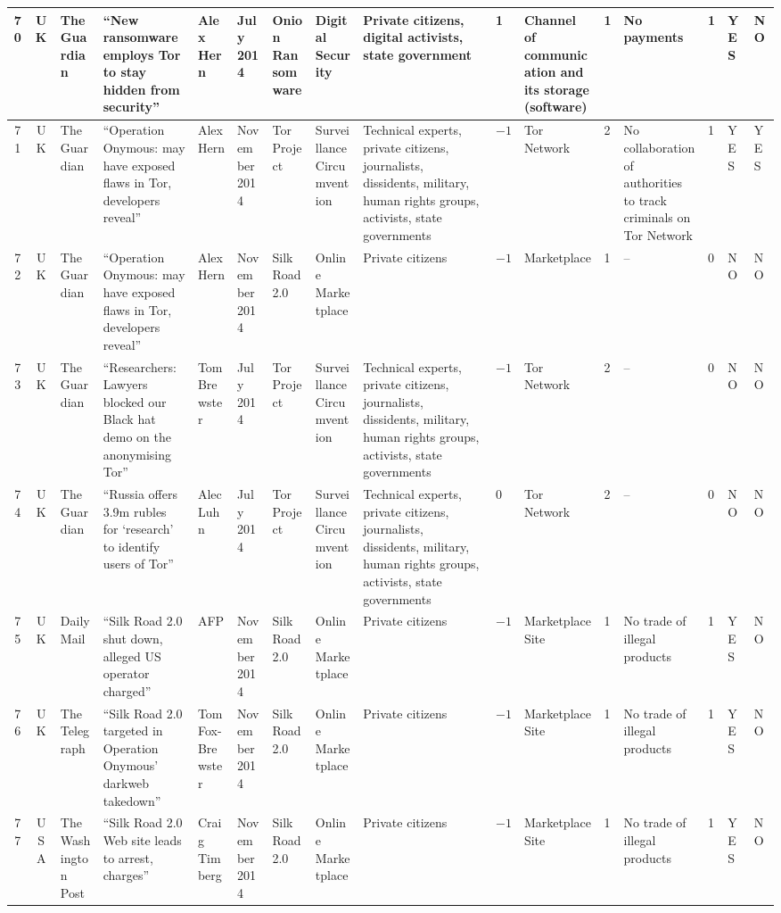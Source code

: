 \begin{landscape}
{\begin{longtable}{|c|c|p{1.2cm}|p{2.5cm}|p{1.4cm}|p{1.2cm}|p{1.4cm}|p{1.2cm}|p{1.8cm}|p{0.4cm}|p{1.8cm}|p{0.4cm}|p{1.5cm}|p{0.4cm}|p{0.6cm}|p{0.6cm}|}
\hline
70 & UK & The Guardian & ``New ransomware employs Tor to stay hidden from security'' & Alex Hern & July 2014 &Onion Ransomware & Digital Security & Private citizens, digital activists, state government & 1 & Channel of communication and its storage (software) & 1 & No payments & 1 & YES & NO \\
\hline
71 & UK & The Guardian & ``Operation Onymous: may have exposed flaws in Tor, developers reveal'' & Alex Hern & November 2014 &Tor Project & Surveillance Circumvention & Technical experts, private citizens, journalists, dissidents, military, human rights groups, activists, state governments & $-1$ & Tor Network & 2 & No collaboration of authorities to track criminals on Tor Network & 1 & YES & YES \\
\hline
72 & UK & The Guardian & ``Operation Onymous: may have exposed flaws in Tor, developers reveal'' & Alex Hern & November 2014 &Silk Road 2.0 & Online Marketplace & Private citizens & $-1$ & Marketplace & 1 & -- & 0 & NO & NO \\
\hline
73 & UK & The Guardian & ``Researchers: Lawyers blocked our Black hat demo on the anonymising Tor'' & Tom Brewster & July 2014 &Tor Project & Surveillance Circumvention & Technical experts, private citizens, journalists, dissidents, military, human rights groups, activists, state governments & $-1$ & Tor Network & 2 & -- & 0 & NO & NO \\
\hline
74 & UK & The Guardian & ``Russia offers 3.9m rubles for `research' to identify users of Tor'' & Alec Luhn & July 2014 &Tor Project & Surveillance Circumvention & Technical experts, private citizens, journalists, dissidents, military, human rights groups, activists, state governments & 0 & Tor Network & 2 & -- & 0 & NO & NO \\
\hline
75 & UK & Daily Mail & ``Silk Road 2.0 shut down, alleged US operator charged'' & AFP & November 2014 &Silk Road 2.0 & Online Marketplace & Private citizens & $-1$ & Marketplace Site & 1 & No trade of illegal products & 1 & YES & NO \\
\hline
76 & UK & The Telegraph & ``Silk Road 2.0 targeted in Operation Onymous' darkweb takedown'' & Tom Fox-Brewster & November 2014 &Silk Road 2.0 & Online Marketplace & Private citizens & $-1$ & Marketplace Site & 1 & No trade of illegal products & 1 & YES & NO \\
\hline
77 & USA & The Washington Post & ``Silk Road 2.0 Web site leads to arrest, charges'' & Craig Timberg & November 2014 &Silk Road 2.0 & Online Marketplace & Private citizens & $-1$ & Marketplace Site & 1 & No trade of illegal products & 1 & YES & NO \\

\end{longtable}}
\end{landscape}
